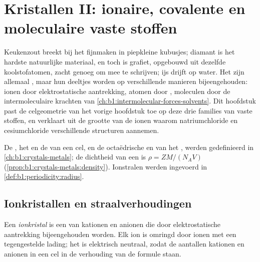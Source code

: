 \chapter{Kristallen II: ionaire, covalente en moleculaire vaste stoffen}\label{ch:b1:crystals-ionic-covalent}

Keukenzout breekt bij het fijnmaken in piepkleine kubusjes; diamant is het
hardste natuurlijke materiaal, en toch is grafiet, opgebouwd uit dezelfde
koolstofatomen, zacht genoeg om mee te schrijven; ijs drijft op water. Het
zijn allemaal , maar hun deeltjes worden op verschillende
manieren bijeengehouden: ionen door elektrostatische aantrekking, atomen
door , moleculen door de intermoleculaire krachten van
\cref{ch:b1:intermolecular-forces-solvents}. Dit hoofdstuk past de
celgeometrie van het vorige hoofdstuk toe op deze drie families van vaste
stoffen, en verklaart uit de grootte van de ionen waarom natriumchloride
en cesiumchloride verschillende structuren aannemen.

\begin{recall}
De , het  en de  van een cel,
en de octaëdrische en  van het  , werden gedefinieerd in
\cref{ch:b1:crystals-metals}; de dichtheid van een  is
$\rho = ZM/(N_A V)$ (\cref{prop:b1:crystals-metals:density}). Ionstralen
werden ingevoerd in \cref{def:b1:periodicity:radius}.
\end{recall}

\section{Ionkristallen en straalverhoudingen}

\begin{definition}[Ionkristal]\label{def:b1:crystals-ionic-covalent:ionic-crystal}
Een \emph{ionkristal} is een  van kationen en
anionen die door elektrostatische aantrekking bijeengehouden worden. Elk
ion is omringd door ionen met een tegengestelde lading; het  is
elektrisch neutraal, zodat de aantallen kationen en anionen in een cel in
de verhouding van de formule staan.
\end{definition}

